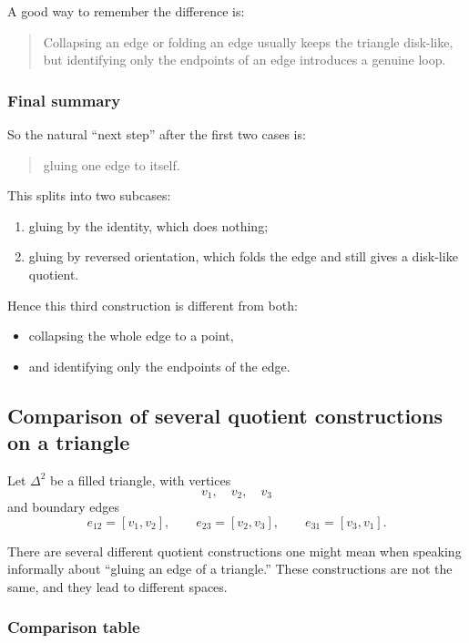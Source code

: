 \documentclass[12pt,a4paper]{article}
\theoremstyle{notespace}
\begin{document}
A good way to remember the difference is:

\begin{quote}
	Collapsing an edge or folding an edge usually keeps the triangle disk-like, but identifying only the endpoints of an edge introduces a genuine loop.
\end{quote}

\subsubsection{Final summary}

So the natural ``next step'' after the first two cases is:

\begin{quote}
	gluing one edge to itself.
\end{quote}

This splits into two subcases:

\begin{enumerate}
	\item gluing by the identity, which does nothing;
	\item gluing by reversed orientation, which folds the edge and still gives a disk-like quotient.
\end{enumerate}

Hence this third construction is different from both:

\begin{itemize}
	\item collapsing the whole edge to a point,
	\item and identifying only the endpoints of the edge.
\end{itemize}

\subsection{Comparison of several quotient constructions on a triangle}

Let \(\Delta^2\) be a filled triangle, with vertices
\[
v_1,\quad v_2,\quad v_3
\]
and boundary edges
\[
e_{12}=[v_1,v_2],\qquad
e_{23}=[v_2,v_3],\qquad
e_{31}=[v_3,v_1].
\]

There are several different quotient constructions one might mean when speaking informally about ``gluing an edge of a triangle.'' These constructions are not the same, and they lead to different spaces.

\subsubsection{Comparison table}
\end{document}
